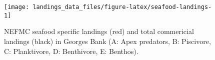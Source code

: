 \documentclass[]{article}
\begin{document}
\begin{figure}

{\centering \texttt{[image: landings\_data\_files/figure-latex/seafood-landings-1]} 

}

\caption{NEFMC seafood specific landings (red) and total commericial landings (black) in Georges Bank (A: Apex predators, B: Piscivore, C: Planktivore, D: Benthivore, E: Benthos).}\label{fig:seafood-landings}
\end{figure}
\end{document}
